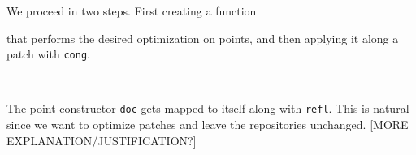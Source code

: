 We proceed in two steps. First creating a function
\begin{code}%
\>[0]\AgdaSpace{}%
\AgdaSymbol{:}\AgdaSpace{}%
\AgdaSymbol{(}\AgdaSpace{}%
\AgdaSymbol{:}\AgdaSpace{}%
\AgdaSymbol{)}\AgdaSpace{}%
\AgdaSpace{}%
\AgdaFunction{Σ[}\AgdaSpace{}%
\AgdaSpace{}%
\AgdaSpace{}%
\AgdaSpace{}%
\AgdaFunction{]}\AgdaSpace{}%
\AgdaSpace{}%
\AgdaSpace{}%
\<%
\end{code}
that performs the desired optimization on points, and then applying it along
a patch with \texttt{cong}.
\begin{code}[hide]%
\>[0]\AgdaSpace{}%
\AgdaSymbol{:}\AgdaSpace{}%
\AgdaSymbol{\{}\AgdaSpace{}%
\AgdaSymbol{:}\AgdaSpace{}%
\AgdaSymbol{\}}\AgdaSpace{}%
\AgdaSpace{}%
\AgdaSymbol{(}\AgdaSpace{}%
\AgdaSymbol{:}\AgdaSpace{}%
\AgdaSymbol{)}\AgdaSpace{}%
\AgdaSpace{}%
\AgdaSpace{}%
\AgdaSymbol{(}\AgdaFunction{Σ[}\AgdaSpace{}%
\AgdaSpace{}%
\AgdaSpace{}%
\AgdaSpace{}%
\AgdaFunction{]}\AgdaSpace{}%
\AgdaSpace{}%
\AgdaSpace{}%
\AgdaSymbol{)}\<%
\\
\>[0]\AgdaSpace{}%
\AgdaSpace{}%
\AgdaSymbol{=}\AgdaSpace{}%
\AgdaSymbol{(}\AgdaSpace{}%
\AgdaOperator{\AgdaInductiveConstructor{,}}\AgdaSpace{}%
\AgdaSymbol{)}\AgdaSpace{}%
\AgdaOperator{\AgdaInductiveConstructor{,}}\AgdaSpace{}%
\AgdaSpace{}%
\AgdaSymbol{(\AgdaUnderscore{}}\AgdaSpace{}%
\AgdaOperator{\AgdaInductiveConstructor{,}}\AgdaSpace{}%
\AgdaSymbol{)}\AgdaSpace{}%
\AgdaSpace{}%
\AgdaSpace{}%
\AgdaSymbol{(}\AgdaSpace{}%
\AgdaSpace{}%
\AgdaOperator{\AgdaInductiveConstructor{,}}\AgdaSpace{}%
\AgdaSpace{}%
\AgdaSpace{}%
\AgdaSpace{}%
\AgdaSpace{}%
\AgdaSpace{}%
\AgdaSymbol{(}\AgdaOperator{\AgdaPrimitive{\textasciitilde{}}}\AgdaSpace{}%
\AgdaSpace{}%
\AgdaSpace{}%
\AgdaSymbol{))}\<%
\end{code}
The point constructor \texttt{doc} gets mapped to itself along with \texttt{refl}.
This is natural since we want to optimize patches and leave the repositories unchanged.
[MORE EXPLANATION/JUSTIFICATION?]
\begin{code}%
\>[0]\AgdaSpace{}%
\AgdaSpace{}%
\AgdaSymbol{=}\AgdaSpace{}%
\AgdaSymbol{(}\AgdaSpace{}%
\AgdaOperator{\AgdaInductiveConstructor{,}}\AgdaSpace{}%
\AgdaSymbol{)}\<%
\end{code}

